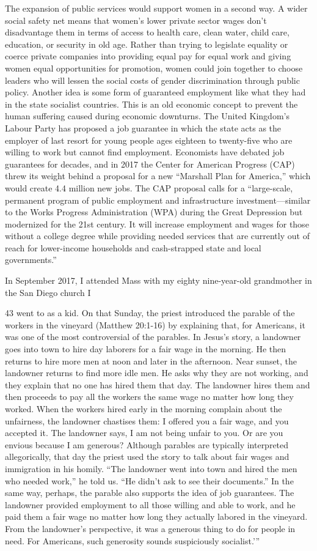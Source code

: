The expansion of public services would support women in a second way. A wider social safety net means that women's lower private sector wages don’t disadvantage them in terms of access to health care, clean water, child care, education, or security in old age. Rather than trying to legislate equality or coerce private companies into providing equal pay for equal work and giving women equal opportunities for promotion, women could join together to choose leaders who will lessen the social costs of gender discrimination through public policy. Another idea is some form of guaranteed employment like what they had in the state socialist countries. This is an old economic concept to prevent the human suffering caused during economic downturns. The United Kingdom’s Labour Party has proposed a job guarantee in which the state acts as the employer of last resort for young people ages eighteen to twenty-five who are willing to work but cannot find employment. Economists have debated job guarantees for decades, and in 2017 the Center for American Progress (CAP) threw its weight behind a proposal for a new “Marshall Plan for America,” which would create {\color{blue}4}.4 million new jobs. The CAP proposal calls for a “large-scale, permanent program of public employment and infrastructure investment—similar to the Works Progress Administration (WPA) during the Great Depression but modernized for the 21st century. It will increase employment and wages for those without a college degree while providing needed services that are currently out of reach for lower-income households and cash-strapped state and local governments.”
 \par 
In September 2017, I attended Mass with my eighty nine-year-old grandmother in the San Diego church I
 \par 
43 went to as a kid. On that Sunday, the priest introduced the parable of the workers in the vineyard (Matthew 20:1-16) by explaining that, for Americans, it was one of the most controversial of the parables. In Jesus’s story, a landowner goes into town to hire day laborers for a fair wage in the morning. He then returns to hire more men at noon and later in the afternoon. Near sunset, the landowner returns to find more idle men. He asks why they are not working, and they explain that no one has hired them that day. The landowner hires them and then proceeds to pay all the workers the same wage no matter how long they worked. When the workers hired early in the morning complain about the unfairness, the landowner chastises them: I offered you a fair wage, and you accepted it. The landowner says, I am not being unfair to you. Or are you envious because I am generous? Although parables are typically interpreted allegorically, that day the priest used the story to talk about fair wages and immigration in his homily. “The landowner went into town and hired the men who needed work,” he told us. “He didn’t ask to see their documents.” In the same way, perhaps, the parable also supports the idea of job guarantees. The landowner provided employment to all those willing and able to work, and he paid them a fair wage no matter how long they actually labored in the vineyard. From the landowner’s perspective, it was a generous thing to do for people in need. For Americans, such generosity sounds suspiciously socialist.'”
